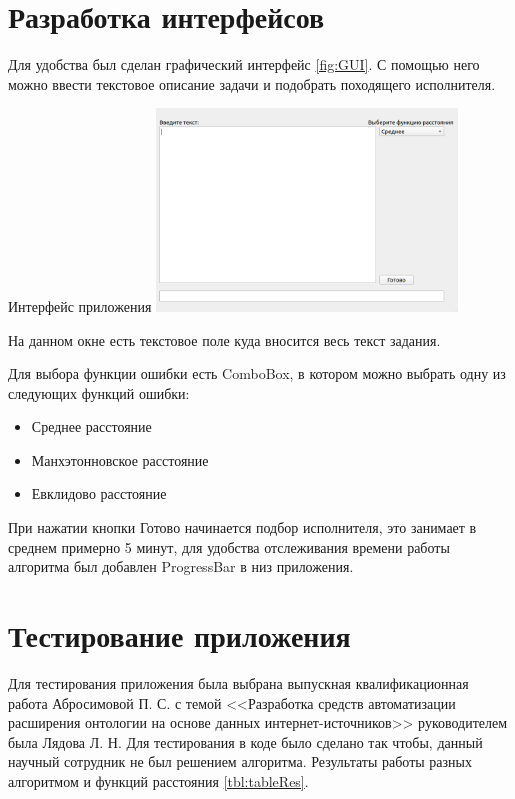 \documentclass[PI,KR]{HSEUniversity}
\begin{document}
\section{Разработка интерфейсов}
Для удобства был сделан графический интерфейс \ref{fig:GUI}. С помощью него можно ввести текстовое описание задачи и подобрать походящего исполнителя.
\begin{FIGURE}[h]{Интерфейс приложения \label{fig:GUI}}
	\includegraphics[width=0.6\textwidth]{img/GUI}
\end{FIGURE}

На данном окне есть текстовое поле куда вносится весь текст задания.

Для выбора функции ошибки есть ComboBox, в котором можно выбрать одну из следующих функций ошибки:
\begin{itemize}
	\item Среднее расстояние
	\item Манхэтонновское расстояние
	\item Евклидово расстояние
\end{itemize}

При нажатии кнопки Готово начинается подбор исполнителя, это занимает в среднем примерно 5 минут, для удобства отслеживания времени работы алгоритма был добавлен ProgressBar в низ приложения.

\section{Тестирование приложения}
Для тестирования приложения была выбрана выпускная квалификационная работа Абросимовой П. С. с темой <<Разработка средств автоматизации расширения онтологии на основе данных интернет-источников>> руководителем была Лядова Л. Н. Для тестирования в коде было сделано так чтобы, данный научный сотрудник не был решением алгоритма. Результаты работы разных алгоритмом и функций расстояния \ref{tbl:tableRes}.
\end{document}
